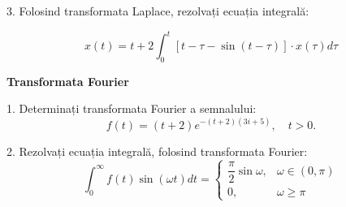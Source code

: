 \vspace{0.3cm}

3. Folosind transformata Laplace, rezolvați ecuația integrală:

\[
    x(t) = t + 2 \int_0^t \left[ t - \tau - \sin(t - \tau) \right] \cdot x(\tau) d \tau
\]

\vspace{0.3cm}

\textbf{Transformata Fourier}

1. Determinați transformata Fourier a semnalului:
\[
    f(t) = (t + 2)e^{-(t + 2)(3i + 5)}, \quad t > 0.
\]

\vspace{0.3cm}

2. Rezolvați ecuația integrală, folosind transformata Fourier:
\[
    \int_0^\infty f(t) \sin (\omega t) dt = %
    \begin{cases}
        \dfrac{\pi}{2} \sin \omega, & \omega \in (0, \pi) \\
        0, & \omega \geq \pi
    \end{cases}
\]